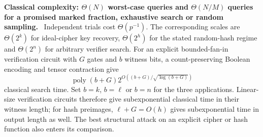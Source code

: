 \documentclass[11pt,a4paper]{article}
\theoremstyle{problemstyle}
\newcommand{\complexity}[2]{\par\noindent\textbf{\boldmath #1 complexity: #2}\ }
\begin{document}
\complexity{Classical}{$\Theta(N)$ worst-case queries and $\Theta(N/M)$ queries for a promised marked fraction, exhaustive search or random sampling.}
Independent trials cost $\Theta(p^{-1})$. The corresponding scales are $\Theta(2^k)$ for ideal-cipher key recovery, $\Theta(2^h)$ for the stated random-hash regime and $\Theta(2^n)$ for arbitrary verifier search. For an explicit bounded-fan-in verification circuit with $G$ gates and $b$ witness bits, a count-preserving Boolean encoding and tensor contraction give
\[
\operatorname{poly}(b+G)2^{O((b+G)/\sqrt{\log(b+G)})}
\]
classical search time. Set $b=k$, $b=\ell$ or $b=n$ for the three applications. Linear-size verification circuits therefore give subexponential classical time in their witness length; for hash preimages, $\ell+G=O(h)$ gives subexponential time in output length as well. The best structural attack on an explicit cipher or hash function also enters its comparison.
\end{document}

